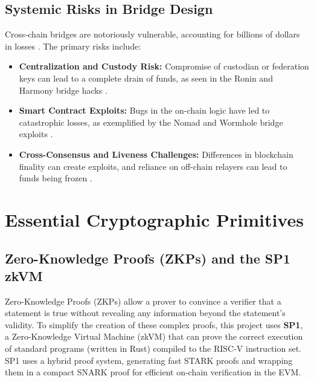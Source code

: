 \documentclass{DESSThesis}
\begin{document}
\subsection{Systemic Risks in Bridge Design}
Cross-chain bridges are notoriously vulnerable, accounting for billions of dollars in losses \cite{team_cross-chain_2022}. The primary risks include:
\begin{itemize}
    \item \textbf{Centralization and Custody Risk:} Compromise of custodian or federation keys can lead to a complete drain of funds, as seen in the Ronin and Harmony bridge hacks \cite{belenkov_sok_2025}.
    \item \textbf{Smart Contract Exploits:} Bugs in the on-chain logic have led to catastrophic losses, as exemplified by the Nomad and Wormhole bridge exploits \cite{notland_sok_2024}.
    \item \textbf{Cross-Consensus and Liveness Challenges:} Differences in blockchain finality can create exploits, and reliance on off-chain relayers can lead to funds being frozen \cite{thomas_protocol_nodate}.
\end{itemize}

\section{Essential Cryptographic Primitives}
\label{sec:cryptographic_primitives}

\subsection{Zero-Knowledge Proofs (ZKPs) and the SP1 zkVM}
\label{subsec:zkp_sp1}
Zero-Knowledge Proofs (ZKPs) allow a prover to convince a verifier that a statement is true without revealing any information beyond the statement's validity. To simplify the creation of these complex proofs, this project uses \textbf{SP1}, a Zero-Knowledge Virtual Machine (zkVM) that can prove the correct execution of standard programs (written in Rust) compiled to the RISC-V instruction set. SP1 uses a hybrid proof system, generating fast STARK proofs and wrapping them in a compact SNARK proof for efficient on-chain verification in the EVM.
\end{document}
